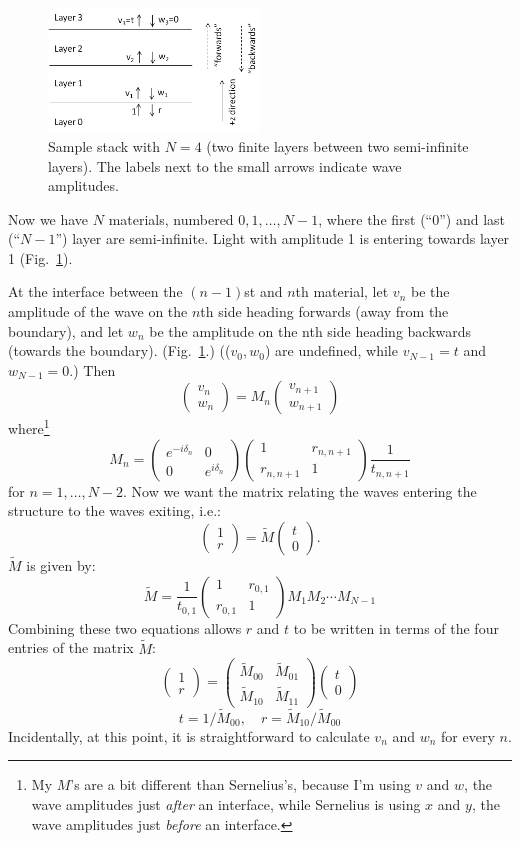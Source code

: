 \documentclass[12pt]{article}
\newcommand{\smat}{\left( \begin{matrix}} %
\newcommand{\emat}{\end{matrix} \right)} %
\renewcommand{\(}{\left(}
\renewcommand{\)}{\right)}
\renewcommand{\r}{\mathbf{r}}
\begin{document}
\begin{figure}[htb]
\centering
\includegraphics[width=0.5\textwidth]{vwdefn.png}
\caption{Sample stack with $N=4$ (two finite layers between two semi-infinite layers). The labels next to the small arrows indicate wave amplitudes.\label{vwdefn}}
\end{figure}

Now we have $N$ materials, numbered $0,1,\ldots,N-1$, where the first (``0'') and last (``$N-1$'') layer are semi-infinite. Light with amplitude 1 is entering towards layer 1 (Fig.~\ref{vwdefn}).

At the interface between the $(n-1)$st and $n$th material, let $v_n$ be the amplitude of the wave on the $n$th side heading forwards (away from the boundary), and let $w_n$ be the amplitude on the nth side heading backwards (towards the boundary). (Fig.~\ref{vwdefn}.) (($v_0,w_0$) are undefined, while $v_{N-1}=t$ and $w_{N-1}=0$.) Then
$$\smat v_n \\ w_n \emat = M_n \smat v_{n+1}\\w_{n+1}\emat$$
where\footnote{My $M$'s are a bit different than Sernelius's, because I'm using $v$ and $w$, the wave amplitudes just \emph{after} an interface, while Sernelius is using $x$ and $y$, the wave amplitudes just \emph{before} an interface.}
$$M_n = \smat e^{- i \delta_n} & 0 \\ 0 & e^{i \delta_n} \emat \smat 1 & r_{n,n+1} \\ r_{n,n+1} & 1 \emat \frac{1}{t_{n,n+1}}$$
for $n=1,\ldots,N-2$. Now we want the matrix relating the waves entering the structure to the waves exiting, i.e.:
$$\smat 1 \\ r \emat = \tilde{M} \smat t \\ 0 \emat.$$
$\tilde{M}$ is given by:
$$\tilde{M} = \frac{1}{t_{0,1}} \smat 1 & r_{0,1} \\ r_{0,1} & 1 \emat M_1 M_2 \cdots M_{N-1}$$
Combining these two equations allows $r$ and $t$ to be written in terms of the four entries of the matrix $\tilde{M}$:
$$\smat 1\\r \emat = \smat \tilde{M}_{00} & \tilde{M}_{01} \\ \tilde{M}_{10} & \tilde{M}_{11} \emat \smat t \\ 0 \emat$$
$$t = 1/\tilde{M}_{00}, \quad r = \tilde{M}_{10}/\tilde{M}_{00}$$
Incidentally, at this point, it is straightforward to calculate $v_n$ and $w_n$ for every $n$.
\end{document}
